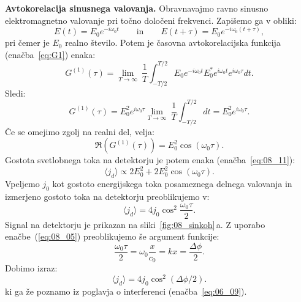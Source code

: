 \begin{example}{\bf Avtokorelacija sinusnega valovanja.}
Obravnavajmo ravno sinusno elektromagnetno valovanje pri točno določeni frekvenci. 
Zapišemo ga v obliki:
\begin{equation}
E(t) = E_0 e^{-i\omega_0 t} \qquad \mathrm{in} \qquad E(t+\tau)= E_0 e^{-i\omega_0(t+\tau)},
\label{eq:08_12}
\end{equation}
pri čemer je $E_0$ realno število. Potem je časovna avtokorelacijska 
funkcija (enačba~\ref{eq:G1}) enaka:
\begin{equation}
G^{(1)}(\tau) = \lim_{T\to \infty}~\frac{1}{T}
\int_{-T/2}^{T/2}E_0 e^{-i\omega_0 t}E_0^*e^{i\omega_0 t}e^{i\omega_0\tau} dt.
\label{eq:08_13}
\end{equation}
Sledi:
\begin{equation}
G^{(1)}(\tau) = E_0^2 e^{i\omega_0 \tau} 
\lim_{T\to \infty}~\frac{1}{T}\int_{-T/2}^{T/2} dt= E_0^2 e^{i\omega_0 \tau}.
\label{eq:08_14}
\end{equation}
Če se omejimo zgolj na realni del, velja:
\begin{equation}
\Re \left( G^{(1)}(\tau)\right) = E_0^2 \cos(\omega_0 \tau).
\label{eq:08_14a}
\end{equation}
Gostota svetlobnega toka na detektorju je potem enaka (enačba~\ref{eq:08_11}):
\begin{equation}
\langle j_d \rangle \propto  
2E_0^2 + 2 E_0^2 \cos(\omega_0 \tau).
\label{eq:08_15}
\end{equation}
Vpeljemo $j_0$ kot gostoto energijskega toka posameznega delnega valovanja 
in izmerjeno  gostoto toka na detektorju preoblikujemo v:
\begin{equation}
\langle j_d \rangle  = 4j_0 \cos^2\frac{\omega_0 \tau}{2}.
\label{eq:08_15a}
\end{equation}
Signal na detektorju je prikazan na sliki~\ref{fig:08_sinkoh}\,a.
Z uporabo enačbe~(\ref{eq:08_05}) preoblikujemo še argument funkcije:
\begin{equation}
\frac{\omega_0 \tau}{2} = \omega_0 \frac{x}{c_0} = k x = \frac{\Delta \phi}{2}.
\label{eq:08_17}
\end{equation}
Dobimo izraz:
\begin{equation}
\langle j_d \rangle  = 4j_0 \cos^2 (\Delta \phi/2).
\label{eq:08_15c}
\end{equation}
ki ga že poznamo iz poglavja o interferenci (enačba~\ref{eq:06_09}). 


\end{example}
